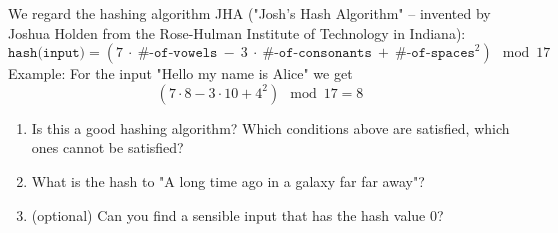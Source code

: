 \documentclass[11pt,a4paper]{report}
\begin{document}
\begin{ex}
We regard the hashing algorithm JHA ("Josh's Hash Algorithm" -- invented by Joshua Holden from the Rose-Hulman Institute of Technology in Indiana): 
\[
\texttt{hash(input)} = (7\ \cdot\ \texttt{\#-of-vowels}\  -\  3\ \cdot \ \texttt{\#-of-consonants}\  +\  \texttt{\#-of-spaces}^2) \mod 17
\]
Example: For the input "Hello my name is Alice" we get
\[
(7\cdot 8 - 3\cdot 10 + 4^2) \mod 17 = 8
\] 
\begin{enumerate}
\item Is this a good hashing algorithm?
Which conditions above are satisfied, which ones cannot be satisfied?
\item What is the hash to "A long time ago in a galaxy far far away"?
\item (optional) Can you find a sensible input that has the hash value $0$?
\end{enumerate}
\end{ex}


\newpage
\end{document}
